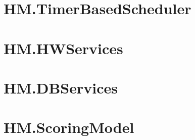 \section{HM.TimerBasedScheduler}





\section{HM.HWServices}
\section{HM.DBServices}\label{sec:HMDBServices}
\section{HM.ScoringModel}